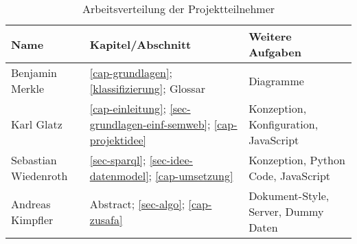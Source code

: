 \begin{table}[h!]
\centering
\begin{tabular}{|l|l|l|}
\hline \textbf{Name} & \textbf{Kapitel/Abschnitt} & \textbf{Weitere Aufgaben} \\ 
\hline Benjamin Merkle & \ref{cap-grundlagen}; \ref{klassifizierung}; Glossar & Diagramme  \\ 
\hline Karl Glatz & \ref{cap-einleitung}; \ref{sec-grundlagen-einf-semweb}; \ref{cap-projektidee} & Konzeption, Konfiguration, JavaScript \\  %
\hline Sebastian Wiedenroth & \ref{sec-sparql}; \ref{sec-idee-datenmodel}; \ref{cap-umsetzung} & Konzeption, Python Code, JavaScript \\ 
\hline Andreas Kimpfler & Abstract; \ref{sec-algo}; \ref{cap-zusafa} & Dokument-Style, Server, Dummy Daten \\  %
\hline 
\end{tabular}

\caption{Arbeitsverteilung der Projektteilnehmer}
\end{table}

